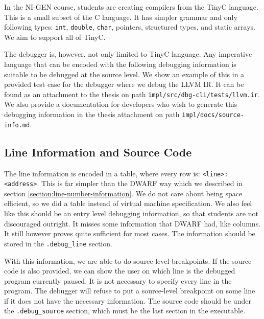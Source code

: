 In the NI-GEN course, students are creating compilers from the TinyC language.
This is a small subset of the C language. It has simpler grammar and only
following types: \texttt{int}, \texttt{double}, \texttt{char}, pointers,
structured types, and static arrays. We aim to support all of TinyC.

The debugger is, however, not only limited to TinyC language. Any imperative
language that can be encoded with the following debugging information is
suitable to be debugged at the source level. We show an example of this in a
provided test case for the debugger where we debug the LLVM IR. It can be found
as an attachment to the thesis on path \texttt{impl/src/dbg-cli/tests/llvm.ir}.
We also provide a documentation for developers who wish to generate this
debugging information in the thesis attachment on path
\texttt{impl/docs/source-info.md}.

\subsection{Line Information and Source Code}
The line information is encoded in a table, where every row is:
\texttt{<line>:<address>}. This is far simpler than the DWARF way which we
described in section \ref{section:line-number-information}. We do not care
about being space efficient, so we did a table instead of virtual machine
specification. We also feel like this should be an entry level debugging
information, so that students are not discouraged outright. It misses some
information that DWARF had, like columns. It still however proves quite
sufficient for most cases. The information should be stored in the
\verb|.debug_line| section.

With this information, we are able to do source-level breakpoints. If the
source code is also provided, we can show the user on which line is the
debugged program currently paused. It is not necessary to specify every line in
the program. The debugger will refuse to put a source-level breakpoint on some
line if it does not have the necessary information. The source code should be
under the \verb|.debug_source| section, which must be the last section in the
executable.

